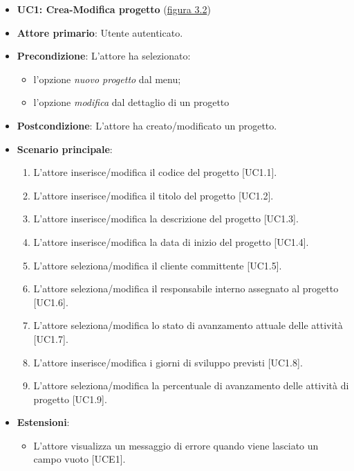 \begin{itemize}
\item \textbf{UC1: Crea-Modifica progetto} ({\hyperref[fig:UC1]{figura 3.2}})
\item \textbf{Attore primario}: Utente autenticato.
\item \textbf{Precondizione}: L'attore ha selezionato: 
\begin{itemize}
\item l'opzione \textit{nuovo progetto} dal menu;
\item l'opzione \textit{modifica} dal dettaglio di un progetto
\end{itemize}
\item \textbf{Postcondizione}: L'attore ha creato/modificato un progetto.
\pagebreak
\item \textbf{Scenario principale}: 
\begin{enumerate}
\item L'attore inserisce/modifica il codice del progetto [UC1.1].
\item L'attore inserisce/modifica il titolo del progetto [UC1.2].
\item L'attore inserisce/modifica la descrizione del progetto [UC1.3].
\item L'attore inserisce/modifica la data di inizio del progetto [UC1.4].
\item L'attore seleziona/modifica il cliente committente [UC1.5].
\item L'attore seleziona/modifica il responsabile interno assegnato al progetto [UC1.6].
\item L'attore seleziona/modifica lo stato di avanzamento attuale delle attività [UC1.7].
\item L'attore inserisce/modifica i giorni di sviluppo previsti [UC1.8].
\item L'attore seleziona/modifica la percentuale di avanzamento delle attività di progetto [UC1.9].
\end{enumerate}
\item \textbf{Estensioni}: 
\begin{itemize}
\item L'attore visualizza un messaggio di errore quando viene lasciato un campo vuoto [UCE1].
\end{itemize} 
\end{itemize}

